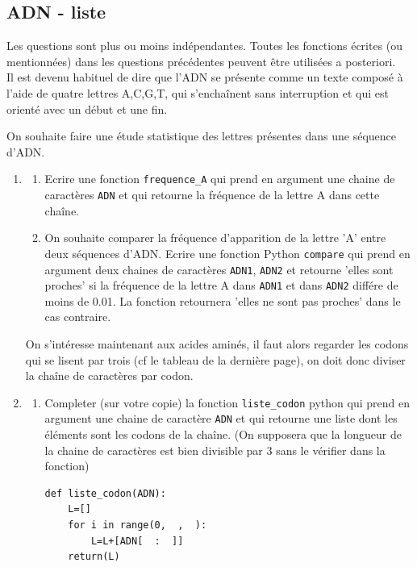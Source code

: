 \subsection{ADN - liste}
\begin{exercice}[Informatique]
Les questions sont plus ou moins indépendantes. Toutes les fonctions écrites (ou mentionnées) dans les questions précédentes peuvent être utilisées a posteriori. \\


Il est devenu habituel de dire que l'ADN se présente comme un texte composé à l'aide de quatre lettres A,C,G,T, qui s'enchaînent sans interruption et qui est orienté avec un début et une fin. 


On souhaite faire une étude statistique des lettres présentes dans une séquence d'ADN. 
\begin{enumerate}
\item \begin{enumerate}


\item Ecrire une fonction \texttt{frequence\_A} qui prend en argument une chaine de caractères \texttt{ADN}  et qui retourne la fréquence de la lettre A dans cette chaîne. 

\item On souhaite comparer la fréquence d'apparition de la lettre 'A' entre deux séquences d'ADN. Ecrire une fonction Python \texttt{compare} qui prend en argument deux chaines de caractères \texttt{ADN1}, \texttt{ADN2} et retourne 'elles sont proches' si la fréquence de la lettre A dans \texttt{ADN1} et dans \texttt{ADN2} différe de moins de 0.01. La fonction retournera 'elles ne sont pas proches' dans le cas contraire. \\
\end{enumerate}

On s'intéresse maintenant aux acides aminés, il faut alors regarder les codons qui se lisent par trois (cf le tableau de la dernière page), on doit donc diviser la chaîne de caractères par codon. 

\item
\begin{enumerate}
\item Completer (sur votre copie) la fonction \texttt{liste\_codon}  python qui prend en argument une chaine de caractère \texttt{ADN} et qui  retourne une liste dont les éléments sont les codons de la chaîne. (On supposera que la longueur de la chaine de caractères est bien divisible par 3 sans le vérifier dans la fonction) 
\begin{lstlisting}
def liste_codon(ADN):
    L=[]
    for i in range(0,  ,  ):
        L=L+[ADN[  :  ]]
    return(L)
\end{lstlisting}


\end{enumerate}
\end{enumerate}
\end{exercice}
